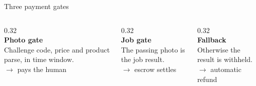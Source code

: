 \begin{frame}{Three payment gates}
  \begin{columns}[T]
    \begin{column}{0.32\textwidth}\centering
      {}\\[0.4em]{\large\bfseries Photo gate}\\
      Challenge code, price and product parse, in time window.\\[0.4em]
      $\rightarrow$ \alert{pays the human}
    \end{column}
    \begin{column}{0.32\textwidth}\centering
      {}\\[0.4em]{\large\bfseries Job gate}\\
      The passing photo is the job result.\\[0.4em]
      $\rightarrow$ \alert{escrow settles}
    \end{column}
    \begin{column}{0.32\textwidth}\centering
      {}\\[0.4em]{\large\bfseries Fallback}\\
      Otherwise the result is withheld.\\[0.4em]
      $\rightarrow$ \alert{automatic refund}
    \end{column}
  \end{columns}
\end{frame}
